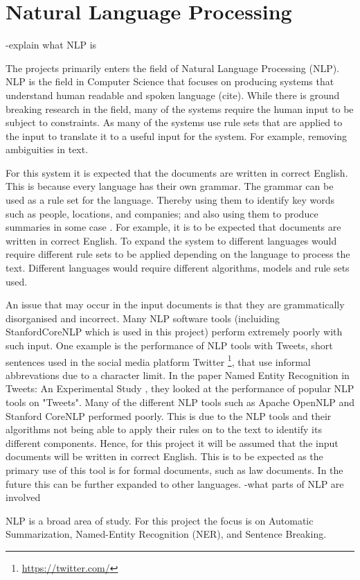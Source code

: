 \section{Natural Language Processing}
-explain what NLP is
\par The projects primarily enters the field of Natural Language Processing (NLP). NLP is the field in Computer Science that focuses on producing systems that understand human readable and spoken language (cite). While there is ground breaking research in the field, many of the systems require the human input to be subject to constraints. As many of the systems use rule sets that are applied to the input to translate it to a useful input for the system. For example, removing ambiguities in text. 
\par For this system it is expected that the documents are written in correct English. This is because every language has their own grammar. The grammar can be used as a rule set for the language. Thereby using them to identify key words such as people, locations, and companies; and also using them to produce summaries in some case \cite{dorrzajicschwartz2003}. For example, it is to be expected that documents are written in correct English. To expand the system to different languages would require different rule sets to be applied depending on the language to process the text. Different languages would require different algorithms, models and rule sets used.
\par An issue that may occur in the input documents is that they are grammatically disorganised and incorrect. Many NLP software tools (incluiding StanfordCoreNLP which is used in this project) perform extremely poorly with such input. One example is the performance of NLP tools with Tweets, short sentences used in the social media platform Twitter \footnote{\url{https://twitter.com/}}, that use informal abbrevations due to a character limit. In the paper Named Entity Recognition in Tweets: An Experimental Study \cite{ritter2011}, they looked at the performance of popular NLP tools on "Tweets". Many of the different NLP tools such as Apache OpenNLP and Stanford CoreNLP performed poorly. This is due to the NLP tools and their algorithms not being able to apply their rules on to the text to identify its different components. Hence, for this project it will be assumed that the input documents will be written in correct English. This is to be expected as the primary use of this tool is for formal documents, such as law documents. In the future this can be further expanded to other languages.
-what parts of NLP are involved
\par NLP is a broad area of study. For this project the focus is on Automatic Summarization, Named-Entity Recognition (NER), and Sentence Breaking.


